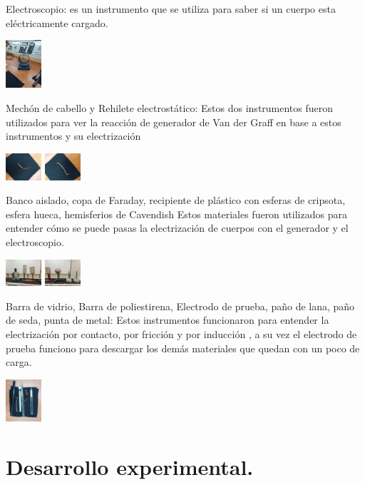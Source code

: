 \documentclass[10pt]{article}
\begin{document}
\begin{multicols}{2}
	

Electroscopio: es un instrumento que se utiliza para saber si un cuerpo esta eléctricamente cargado. 

\includegraphics[width=0.1\textwidth]{Metro}

Mechón de cabello y Rehilete electrostático: 
Estos dos instrumentos fueron utilizados para ver la reacción de generador de Van der Graff en base a estos instrumentos y su electrización 

\includegraphics[width=0.1\textwidth]{Pelo}
\includegraphics[width=0.1\textwidth]{Rehilete}


Banco aislado, copa de Faraday, recipiente de plástico con esferas de cripsota, esfera hueca, hemisferios de Cavendish
Estos materiales fueron utilizados para entender cómo se puede pasas la electrización de cuerpos con el generador y el electroscopio.

\includegraphics[width=0.1\textwidth]{copas}
\includegraphics[width=0.1\textwidth]{bolas}

Barra de vidrio, Barra de poliestirena, Electrodo de prueba, paño de lana, paño de seda, punta de metal:
Estos instrumentos funcionaron para entender la electrización por contacto, por fricción y por inducción , a su vez el electrodo de prueba funciono para descargar los demás materiales que quedan con un poco de carga. 

\includegraphics[width=0.1\textwidth]{Herramientas}
\section{Desarrollo experimental.}


\end{multicols}
\end{document}
